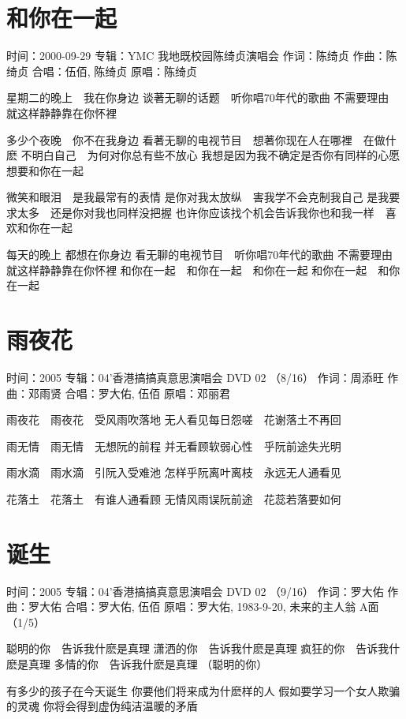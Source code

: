 \documentclass[UTF8,a4paper,oneside,twocolumn,12pt]{ctexbook}
\newcommand{\infopair}[2]{\textbullet #1：#2}
\newcommand{\zc}[1][伍佰]{\infopair{作词}{#1}}
\newcommand{\zq}[1][伍佰]{\infopair{作曲}{#1}}
\newcommand{\zj}[1]{\infopair{专辑}{#1}}
\newcommand{\yc}[1]{\infopair{原唱}{#1}}
\newcommand{\sj}[1]{\infopair{时间}{#1}}
\newenvironment{info}{\begin{flushleft}\kaishu
	}
	{\end{flushleft}\normalsize\yahei\par}
\newenvironment{lyric}{
	}
{}
\begin{document}
\section{和你在一起}
\begin{info}
	\sj{2000-09-29}
	\zj{YMC 我地既校园陈绮贞演唱会}
	\zc[陈绮贞]
	\zq[陈绮贞]
	\infopair{合唱}{伍佰, 陈绮贞}
	\yc{陈绮贞}
\end{info}
\begin{lyric}
	星期二的晚上　我在你身边
	谈著无聊的话题　听你唱70年代的歌曲
	不需要理由　就这样静静靠在你怀裡

	多少个夜晚　你不在我身边
	看著无聊的电视节目　想著你现在人在哪裡　在做什麽
	不明白自己　为何对你总有些不放心
	我想是因为我不确定是否你有同样的心愿　想要和你在一起

	微笑和眼泪　是我最常有的表情
	是你对我太放纵　害我学不会克制我自己
	是我要求太多　还是你对我也同样没把握
	也许你应该找个机会告诉我你也和我一样　喜欢和你在一起

	每天的晚上  都想在你身边
	看无聊的电视节目　听你唱70年代的歌曲
	不需要理由　就这样静静靠在你怀裡
	和你在一起　和你在一起　和你在一起
	和你在一起　和你在一起
\end{lyric}

\section{雨夜花}
\begin{info}
	\sj{2005}
	\zj{04'香港搞搞真意思演唱会 DVD 02 （8/16）}
	\zc[周添旺]
	\zq[邓雨贤]
	\infopair{合唱}{罗大佑, 伍佰}
	\yc{邓丽君}
\end{info}
\begin{lyric}
	雨夜花　雨夜花　受风雨吹落地
	无人看见每日怨嗟　花谢落土不再回

	雨无情　雨无情　无想阮的前程
	并无看顾软弱心性　乎阮前途失光明

	雨水滴　雨水滴　引阮入受难池
	怎样乎阮离叶离枝　永远无人通看见

	花落土　花落土　有谁人通看顾
	无情风雨误阮前途　花蕊若落要如何
\end{lyric}

\section{诞生}
\begin{info}
	\sj{2005}
	\zj{04'香港搞搞真意思演唱会 DVD 02 （9/16）}
	\zc[罗大佑]
	\zq[罗大佑]
	\infopair{合唱}{罗大佑, 伍佰}
	\yc{罗大佑, 1983-9-20, 未来的主人翁 A面（1/5）}
\end{info}
\begin{lyric}
	聪明的你　告诉我什麽是真理
	潇洒的你　告诉我什麽是真理
	疯狂的你　告诉我什麽是真理
	多情的你　告诉我什麽是真理
	（聪明的你）

	有多少的孩子在今天诞生
	你要他们将来成为什麽样的人
	假如要学习一个女人欺骗的灵魂
	你将会得到虚伪纯洁温暖的矛盾
\end{lyric}
\end{document}
